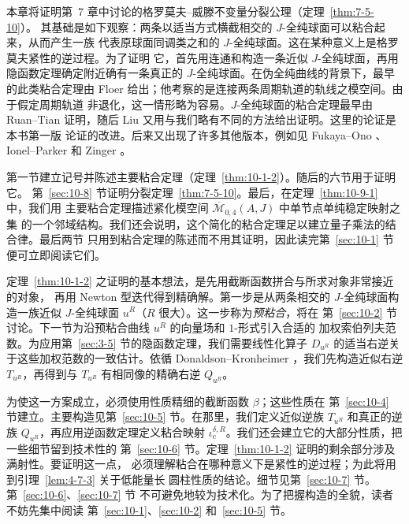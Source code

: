 
本章将证明第~7 章中讨论的格罗莫夫--威滕不变量分裂公理（定理~\ref{thm:7-5-10}）。
其基础是如下观察：两条以适当方式横截相交的 $J$-全纯球面可以粘合起来，从而产生一族
代表原球面同调类之和的 $J$-全纯球面。这在某种意义上是格罗莫夫紧性的逆过程。为了证明
它，首先用连通和构造一条近似 $J$-全纯球面，再用隐函数定理确定附近确有一条真正的
$J$-全纯球面。在伪全纯曲线的背景下，最早的此类粘合定理由 Floer
 给出；他考察的是连接两条周期轨道的轨线之模空间。由于假定周期轨道
非退化，这一情形略为容易。$J$-全纯球面的粘合定理最早由 Ruan--Tian 
证明，随后 Liu  又用与我们略有不同的方法给出证明。这里的论证是本书第一版
论证的改进。后来又出现了许多其他版本，例如见 Fukaya--Ono 、
Ionel--Parker  和 Zinger 。

第一节建立记号并陈述主要粘合定理（定理~\ref{thm:10-1-2}）。随后的六节用于证明它。
第~\ref{sec:10-8} 节证明分裂定理~\ref{thm:7-5-10}。最后，在定理~\ref{thm:10-9-1} 中，我们用
主要粘合定理描述紧化模空间 $\overline{\mathcal M}_{0,4}(A,J)$ 中单节点单纯稳定映射之集
的一个邻域结构。我们还会说明，这个简化的粘合定理足以建立量子乘法的结合律。最后两节
只用到粘合定理的陈述而不用其证明，因此读完第~\ref{sec:10-1} 节便可立即阅读它们。

定理~\ref{thm:10-1-2} 之证明的基本想法，是先用截断函数拼合与所求对象非常接近的对象，
再用 Newton 型迭代得到精确解。第一步是从两条相交的 $J$-全纯球面构造一族近似
$J$-全纯球面 $u^R$（$R$ 很大）。这一步称为\emph{预粘合}，将在
第~\ref{sec:10-2} 节讨论。下一节为沿预粘合曲线 $u^R$ 的向量场和 $1$-形式引入合适的
加权索伯列夫范数。为应用第~\ref{sec:3-5} 节的隐函数定理，我们需要线性化算子
$D_{u^R}$ 的适当右逆关于这些加权范数的一致估计。依循 Donaldson--Kronheimer
，我们先构造近似右逆 $T_{u^R}$，再得到与 $T_{u^R}$ 有相同像的精确右逆
$Q_{u^R}$。

为使这一方案成立，必须使用性质精细的截断函数 $\beta$；这些性质在
第~\ref{sec:10-4} 节建立。主要构造见第~\ref{sec:10-5} 节。在那里，我们定义近似逆族
$T_{u^R}$ 和真正的逆族 $Q_{u^R}$，再应用逆函数定理定义粘合映射
$\iota_c^{\delta,R}$。我们还会建立它的大部分性质，把一些细节留到技术性的
第~\ref{sec:10-6} 节。定理~\ref{thm:10-1-2} 证明的剩余部分涉及满射性。要证明这一点，
必须理解粘合在哪种意义下是紧性的逆过程；为此将用到引理~\ref{lem:4-7-3} 关于低能量长
圆柱性质的结论。细节见第~\ref{sec:10-7} 节。第~\ref{sec:10-6}、\ref{sec:10-7} 节
不可避免地较为技术化。为了把握构造的全貌，读者不妨先集中阅读
第~\ref{sec:10-1}、\ref{sec:10-2} 和~\ref{sec:10-5} 节。

